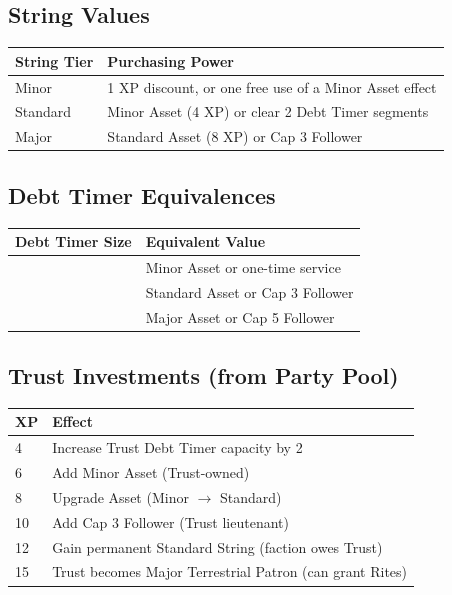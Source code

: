 \subsection{String Values}
\label{ref:string-values}

\begin{center}
\small
\begin{tabular}{ll}
\toprule
\textbf{String Tier} & \textbf{Purchasing Power} \\
\midrule
Minor & 1 XP discount, or one free use of a Minor Asset effect \\
Standard & Minor Asset (4 XP) or clear 2 Debt Timer segments \\
Major & Standard Asset (8 XP) or Cap 3 Follower \\
\bottomrule
\end{tabular}
\end{center}

\subsection{Debt Timer Equivalences}
\label{ref:debt-timer}

\begin{center}
\small
\begin{tabular}{ll}
\toprule
\textbf{Debt Timer Size} & \textbf{Equivalent Value} \\
\midrule
[4] & Minor Asset or one-time service \\
[6] & Standard Asset or Cap 3 Follower \\
[8] & Major Asset or Cap 5 Follower \\
\bottomrule
\end{tabular}
\end{center}

\subsection{Trust Investments (from Party Pool)}
\label{ref:trust-invest}

\begin{center}
\small
\begin{tabular}{ll}
\toprule
\textbf{XP} & \textbf{Effect} \\
\midrule
4 & Increase Trust Debt Timer capacity by 2 \\
6 & Add Minor Asset (Trust-owned) \\
8 & Upgrade Asset (Minor $\rightarrow$ Standard) \\
10 & Add Cap 3 Follower (Trust lieutenant) \\
12 & Gain permanent Standard String (faction owes Trust) \\
15 & Trust becomes Major Terrestrial Patron (can grant Rites) \\
\bottomrule
\end{tabular}
\end{center}

